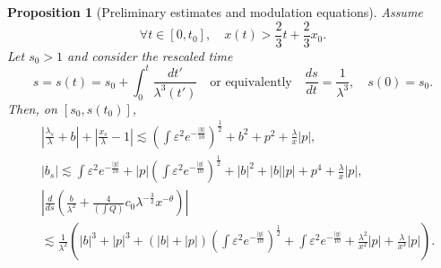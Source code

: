 \documentclass[11pt,a4paper,reqno]{amsart}
\newtheorem{proposition}[theorem]{Proposition}
\theoremstyle{remark}
\numberwithin{equation}{section}
\newcommand{\be}{\begin{equation}}
\newcommand{\ee}{\end{equation}}
\def\e{\varepsilon}
\def\lsl{\frac{\lambda_s}{\lambda}}
\def\l{\lambda}
\def\lsl{\frac{\lambda_s}{\lambda}}
\begin{document}
\begin{proposition}[Preliminary estimates and modulation equations]
Assume
\be\label{surX}
\forall t\in [0,t_0],\quad x(t) > \frac 23 t + \frac 23 {x_0}.
\ee
Let $s_0>1$ and consider the rescaled time 
\be
\label{rescaledtime}
{s}=s(t)=  s_0+ \int_{0}^{t} \frac {dt'}{{\lambda}^3(t')} \quad 
\text{or equivalently}\quad
\frac {d{s}}{dt} = \frac 1{{\lambda}^3},\quad s(0)=s_0.
\ee 
Then, on $[s_0,s(t_0)]$,
\begin{align}
& \left|\frac {{\lambda}_{s}}{\lambda} + {b}\right|+\left| \frac { x_{s}}{\lambda} - 1 \right|  
  \lesssim  
\left(\int \varepsilon^2 {e^{-\frac{|y|}{10}}} \right)^{\frac 12} +  b^2
  +p^2
 + \frac \l x |p|,\label{eq:2002bis} \\
& |{b}_{s}|  \lesssim
 \int  \varepsilon^2   {e^{-\frac{|y|}{10}}}+|p| \left( \int \varepsilon^2 {e^{-\frac{|y|}{10}}} \right)^{\frac 12}+|b|^2+  |b| |p| +p^4
 + \frac \l x |p| ,\label{eq:2003}\\
 & \left| \frac d{ds} \left(\frac b{\l^2} + \frac 4{\left(\int Q\right)}c_0     \l^{-\frac 32}  x^{-\theta} \right)   \right|\label{fond} \\ & \lesssim  \frac 1{\l^2} 
\left(  |b|^3+|p|^3 +   (|b|+|p|)\left(\int \varepsilon^2 {e^{-\frac{|y|}{10}}} \right)^{\frac 12}
+ \int \varepsilon^2 {e^{-\frac{|y|}{10}}} +  \frac {\l^2}{x^2} |p| +  \frac {\l}{x^3} |p|   \right).
\nonumber
\end{align}
\end{proposition}
\end{document}
